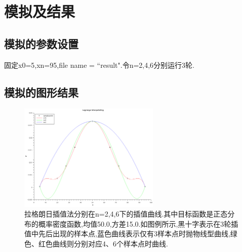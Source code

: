 \documentclass[10pt,a4paper]{article}
\begin{document}
\section{模拟及结果}
\subsection{模拟的参数设置}
固定x0=5,xn=95,file name = ``result".令n=2,4,6分别运行3轮.

\subsection{模拟的图形结果}
\begin{figure}[H]
\centering
\includegraphics[width=0.6\textwidth]{../result/Graph2.png}
\caption{拉格朗日插值法分别在n=2,4,6下的插值曲线.其中目标函数是正态分布的概率密度函数,均值50.0,方差15.0.如图例所示,黑十字表示在3轮插值中先后出现的样本点,蓝色曲线表示仅有3样本点时抛物线型曲线,绿色、红色曲线则分别对应4、6个样本点时曲线.}
\end{figure}
\end{document}
